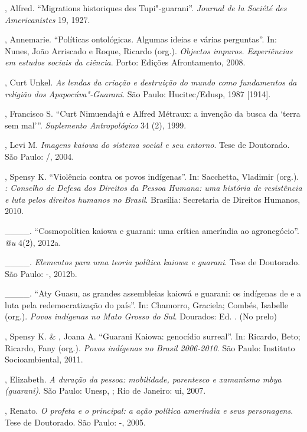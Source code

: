 \begin{Parskip}
, Alfred. ``Migrations historiques des Tupi"-guarani''. \emph{Journal
de la Société des Americanistes} 19, 1927.

, Annemarie. ``Políticas ontológicas. Algumas ideias e várias
perguntas''. In: Nunes, João Arriscado e Roque, Ricardo (org.). \emph{Objectos
impuros. Experiências em estudos sociais da ciência}. Porto: Edições
Afrontamento, 2008.

, Curt Unkel. \emph{As lendas da criação e destruição do mundo
como fundamentos da religião dos Apapocúva"-Guarani}. São Paulo:
Hucitec/Edusp, 1987 [1914].

, Francisco S. ``Curt Nimuendajú e Alfred Métraux: a invenção
da busca da `terra sem mal'''. \emph{Suplemento Antropológico} 34 (2), 1999. 

, Levi M. \emph{Imagens kaiowa do sistema social e seu entorno}.
Tese de Doutorado. São Paulo: /, 2004.

, Spensy K. ``Violência contra os povos indígenas''. In:
Sacchetta, Vladimir (org.). \emph{: Conselho de Defesa dos Direitos da
Pessoa Humana: uma história de resistência e luta pelos direitos
humanos no Brasil}. Brasília: Secretaria de Direitos Humanos, 2010.

\_\_\_\_. ``Cosmopolítica kaiowa e guarani: uma crítica ameríndia ao
agronegócio''. \emph{@u} 4(2), 2012a.

\_\_\_\_. \emph{Elementos para uma teoria política kaiowa e guarani}. Tese
de Doutorado. São Paulo: -, 2012b. 

\_\_\_\_. ``Aty Guasu, as grandes assembleias kaiowá e guarani: os
indígenas de  e a luta pela redemocratização do país''. In: Chamorro,
Graciela; Combés, Isabelle (org.). \emph{Povos indígenas no Mato Grosso do
Sul}. Dourados: Ed. . (No prelo)

, Spensy K. \& , Joana A. ``Guarani Kaiowa: genocídio
surreal''. In: Ricardo, Beto; Ricardo, Fany (org.). \emph{Povos indígenas no
Brasil 2006-2010}. São Paulo: Instituto Socioambiental, 2011.

, Elizabeth. \emph{A duração da pessoa: mobilidade, parentesco
e xamanismo mbya (guarani)}. São Paulo: Unesp, ; Rio de Janeiro:
ui, 2007.

, Renato. \emph{O profeta e o principal: a ação política
ameríndia e seus personagens}. Tese de Doutorado. São Paulo: -,
2005.


\end{Parskip}
